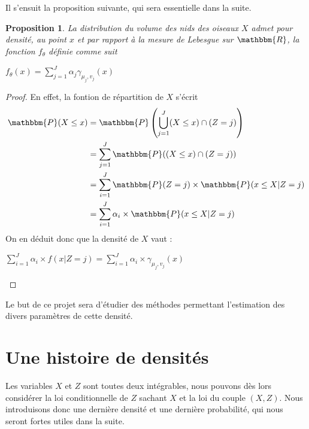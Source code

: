 \documentclass[frenchb]{report}
\newcommand{\R}{\mathbbm{R}}
\newcommand{\1}{\mathbbm{1}}
\newcommand{\prob}{\mathbbm{P}}
\newtheorem{prop}{Proposition}
\theoremstyle{definition}\newtheorem{defn}{Définition}
\theoremstyle{definition}\newtheorem{exm}{Exemple}
\theoremstyle{definition}\newtheorem{nota}{Notation}
\theoremstyle{definition}\newtheorem{rem}{Remarque}
\begin{document}
Il s'ensuit la proposition suivante, qui sera essentielle dans la suite.
\begin{prop}
La distribution du volume des nids des oiseaux $X$ admet pour densité, au point $x$ et par rapport à la mesure de Lebesgue sur $\R$, la fonction $f_ \theta$ définie comme suit
\begin{center} $f_\theta(x) = \displaystyle\sum_{j=1}^J \alpha_j \gamma_{\mu_j, v_j}(x) $ \end{center}
\end{prop}

\begin{proof}
En effet, la fontion de répartition de $X$ s'écrit
\begin{align*}
\prob(X\leq x) &= \prob\left(\bigcup_{j=1}^J (X\leq x)\cap(Z=j)\right)\\
&=\displaystyle\sum_{j=1}^J \prob((X\leq x)\cap(Z=j))\\
&=\displaystyle\sum_{i=1}^J\prob(Z=j)\times\prob(x\leq X | Z = j) \\
&=\displaystyle\sum_{i=1}^J\alpha_i\times\prob(x\leq X | Z = j) \\
\end{align*}
On en déduit donc que la densité de $X$ vaut :
\begin{center}
$\displaystyle\sum_{i=1}^J\alpha_i\times f(x| Z = j)  = \displaystyle\sum_{i=1}^J\alpha_i\times \gamma_{\mu_j, v_j}(x)$
\end{center}
\end{proof}

Le but de ce projet sera d'étudier des méthodes permettant l'estimation des divers paramètres de cette densité.

\section{Une histoire de densités}
Les variables $X$ et $Z$ sont toutes deux intégrables, nous pouvons dès lors considérer la loi conditionnelle de $Z$ sachant $X$ et la loi du couple $(X,Z)$. Nous introduisons donc une dernière densité et une dernière probabilité, qui nous seront fortes utiles dans la suite. 
\end{document}
